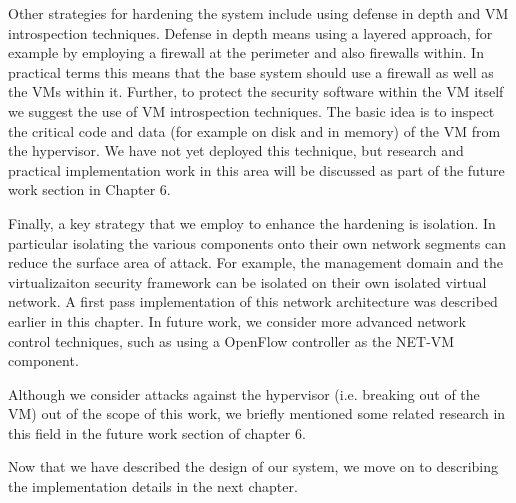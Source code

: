 Other strategies for hardening the system include using defense in depth and VM introspection techniques. Defense in depth means using a layered approach, for example by employing a firewall at the perimeter and also firewalls within. In practical terms this means that the base system should use a firewall as well as the VMs within it. Further, to protect the security software within the VM itself we suggest the use of VM introspection techniques. The basic idea is to inspect the critical code and data (for example on disk and in memory) of the VM from the hypervisor. We have not yet deployed this technique, but research and practical implementation work in this area will be discussed as part of the future work section in Chapter 6.

Finally, a key strategy that we employ to enhance the hardening is isolation. In particular isolating the various components onto their own network segments can reduce the surface area of attack. For example, the management domain and the virtualizaiton security framework can be isolated on their own isolated virtual network. A first pass implementation of this network architecture was described earlier in this chapter. In future work, we consider more advanced network control techniques, such as using a OpenFlow controller as the NET-VM component.

Although we consider attacks against the hypervisor (i.e. breaking out of the VM) out of the scope of this work, we briefly mentioned some related research in this field in the future work section of chapter 6.

Now that we have described the design of our system, we move on to describing the implementation details in the next chapter.

